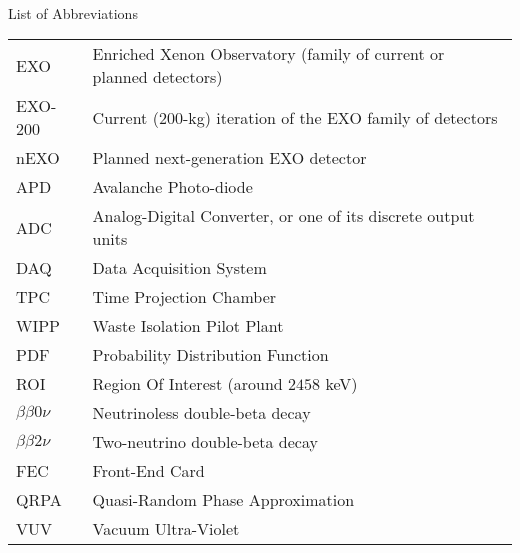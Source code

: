 
\renewcommand{\baselinestretch}{1}
\small\normalsize
\hbox{\ }

\vspace{-4em}

\begin{center}
\large{List of Abbreviations}
\end{center} 

\vspace{3pt}

\begin{tabular}{ll}
EXO & Enriched Xenon Observatory (family of current or planned detectors) \\
EXO-200 & Current (200-kg) iteration of the EXO family of detectors \\
nEXO & Planned next-generation EXO detector \\
APD & Avalanche Photo-diode \\
ADC & Analog-Digital Converter, or one of its discrete output units \\
DAQ & Data Acquisition System \\
TPC & Time Projection Chamber \\
WIPP & Waste Isolation Pilot Plant \\
PDF & Probability Distribution Function \\
ROI & Region Of Interest (around $2458$ keV) \\
$\beta\beta 0\nu$ & Neutrinoless double-beta decay \\
$\beta\beta 2\nu$ & Two-neutrino double-beta decay \\
FEC & Front-End Card \\
QRPA & Quasi-Random Phase Approximation \\
VUV & Vacuum Ultra-Violet
\end{tabular}
